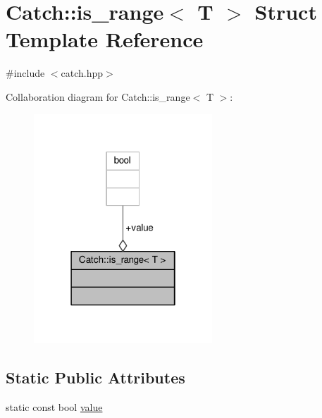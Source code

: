 \hypertarget{struct_catch_1_1is__range}{\section{Catch\-:\-:is\-\_\-range$<$ T $>$ Struct Template Reference}
\label{struct_catch_1_1is__range}
}


{\ttfamily \#include $<$catch.\-hpp$>$}



Collaboration diagram for Catch\-:\-:is\-\_\-range$<$ T $>$\-:
\nopagebreak
\begin{figure}[H]
\begin{center}
\leavevmode
\includegraphics[width=190pt]{struct_catch_1_1is__range__coll__graph}
\end{center}
\end{figure}
\subsection*{Static Public Attributes}
\begin{DoxyCompactItemize}
\item 
static const bool \hyperlink{struct_catch_1_1is__range_afaec39e819c3956829cbbd00feba11be}{value}
\end{DoxyCompactItemize}


